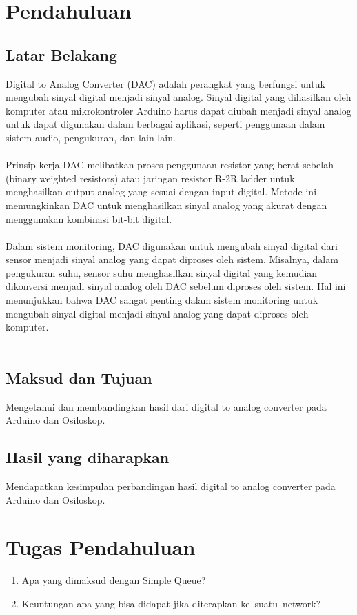 \section{Pendahuluan}
\subsection{Latar Belakang}
Digital to Analog Converter (DAC) adalah perangkat yang berfungsi untuk mengubah sinyal digital menjadi sinyal analog. 
Sinyal digital yang dihasilkan oleh komputer atau mikrokontroler Arduino harus dapat diubah menjadi sinyal analog untuk dapat digunakan dalam berbagai aplikasi, seperti penggunaan dalam sistem audio, pengukuran, dan lain-lain.
\\\\
Prinsip kerja DAC melibatkan proses penggunaan resistor yang berat sebelah (binary weighted resistors) atau jaringan resistor R-2R ladder untuk menghasilkan output analog yang sesuai dengan input digital. 
Metode ini memungkinkan DAC untuk menghasilkan sinyal analog yang akurat dengan menggunakan kombinasi bit-bit digital.
\\\\
Dalam sistem monitoring, DAC digunakan untuk mengubah sinyal digital dari sensor menjadi sinyal analog yang dapat diproses oleh sistem. 
Misalnya, dalam pengukuran suhu, sensor suhu menghasilkan sinyal digital yang kemudian dikonversi menjadi sinyal analog oleh DAC sebelum diproses oleh sistem. 
Hal ini menunjukkan bahwa DAC sangat penting dalam sistem monitoring untuk mengubah sinyal digital menjadi sinyal analog yang dapat diproses oleh komputer.
\\\\

\subsection{Maksud dan Tujuan}
Mengetahui dan membandingkan hasil dari digital to analog converter pada Arduino dan Osiloskop.

\subsection{Hasil yang diharapkan}
Mendapatkan kesimpulan perbandingan hasil digital to analog converter pada Arduino dan Osiloskop.
\section{Tugas Pendahuluan}
\begin{center}
	\colorbox{cyan!30}{\parbox{0.8\linewidth}{
    \begin{enumerate}
        \item Apa yang dimaksud dengan Simple Queue?
        \item Keuntungan apa yang bisa didapat jika diterapkan ke suatu network?
    \end{enumerate}}}
\end{center}

